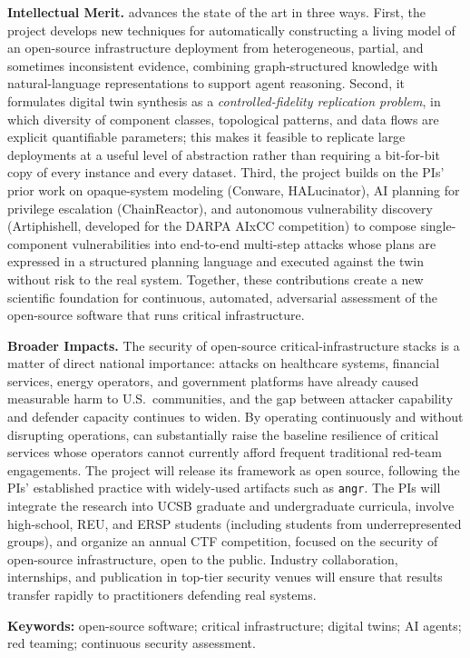 \smallskip
\noindent\textbf{Intellectual Merit.}
\sysname advances the state of the art in three ways. First, the project
develops new techniques for automatically constructing a living model of
an open-source infrastructure deployment from heterogeneous, partial,
and sometimes inconsistent evidence, combining graph-structured
knowledge with natural-language representations to support agent
reasoning. Second, it formulates digital
twin synthesis as a \emph{controlled-fidelity replication problem}, in
which diversity of component classes, topological patterns, and data
flows are explicit quantifiable parameters; this makes it feasible to
replicate large deployments at a useful level of abstraction rather
than requiring a bit-for-bit copy of every instance and every dataset.
Third, the project builds on
the PIs' prior work on opaque-system modeling (Conware, HALucinator), AI
planning for privilege escalation (ChainReactor), and autonomous
vulnerability discovery (Artiphishell, developed for the DARPA AIxCC
competition) to compose single-component vulnerabilities into end-to-end
multi-step attacks whose plans are expressed in a structured planning
language and executed against the twin without risk to the real system.
Together, these contributions create a new scientific foundation for
continuous, automated, adversarial assessment of the open-source
software that runs critical infrastructure.

\smallskip
\noindent\textbf{Broader Impacts.}
The security of open-source critical-infrastructure stacks is a matter
of direct national importance: attacks on healthcare systems,
financial services, energy operators, and government platforms have
already caused measurable harm to U.S.\ communities, and
the gap between attacker capability and defender capacity continues to
widen. By operating continuously and without disrupting operations,
\sysname can substantially raise the baseline resilience of critical
services whose operators cannot currently afford frequent traditional
red-team engagements. The project will release its framework as open
source, following the PIs' established practice with widely-used
artifacts such as \texttt{angr}. The PIs will integrate the research
into UCSB graduate and undergraduate curricula, involve high-school,
REU, and ERSP students (including students from underrepresented
groups), and organize an annual CTF competition, focused on the
security of open-source infrastructure, open to
the public. Industry collaboration, internships, and publication in
top-tier security venues will ensure that results transfer rapidly to
practitioners defending real systems.

\smallskip
\noindent\textbf{Keywords:} open-source software; critical
infrastructure; digital twins; AI agents; red teaming; continuous
security assessment.
